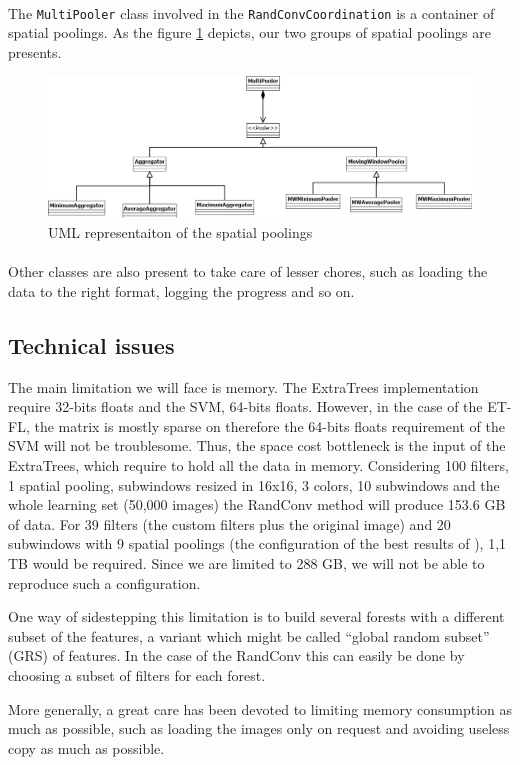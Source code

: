 \documentclass[a4paper]{report}
\begin{document}
		
		\paragraph{}
		The \texttt{MultiPooler} class involved in the \texttt{RandConvCoordination} is a container of spatial poolings. As the figure \ref{fig:uml-pooling} depicts, our two groups of spatial poolings are presents.
		
		
		\begin{figure}
			\centering
				\includegraphics[width=1.00\textwidth]{images/uml-pooling.png}
			\caption{UML representaiton of the spatial poolings}
			\label{fig:uml-pooling}
		\end{figure}
		
		
		\paragraph{}
		Other classes are also present to take care of lesser chores, such as loading the data to the right format, logging the progress and so on.
		
		
		\subsection{\label{sub:TechnicalIssues}Technical issues}
		The main limitation we will face is memory. The ExtraTrees implementation require 32-bits floats and the SVM, 64-bits floats. However, in the case of the ET-FL, the matrix is mostly sparse on therefore the 64-bits floats requirement of the SVM will not be troublesome. Thus, the space cost bottleneck is the input of the ExtraTrees, which require to hold all the data in memory. Considering 100 filters, 1 spatial pooling, subwindows resized in 16x16, 3 colors, 10 subwindows and the whole learning set (50,000 images) the RandConv method will produce 153.6 GB of data. For 39 filters (the custom filters plus the original image) and 20 subwindows with 9 spatial poolings (the configuration of the best results of \cite{base}), 1,1 TB would be required. Since we are limited to 288 GB, we will not be able to reproduce such a configuration.
		\par
		One way of sidestepping this limitation is to build several forests with a different subset of the features, a variant which might be called ``global random subset'' (GRS) of features. 
		In the case of the RandConv this can easily be done by choosing a subset of filters for each forest.
		\par
		More generally, a great care has been devoted to limiting memory consumption as much as possible, such as loading the images only on request and avoiding useless copy as much as possible. 
		
\end{document}
